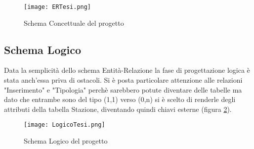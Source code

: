 \begin{figure}[ht!]
    \centering
    {\texttt{[image: ERTesi.png]}}
    \caption{Schema Concettuale del progetto}
    \label{schemaEr}
\end{figure} 

\subsection{Schema Logico}
Data la semplicità dello schema Entità-Relazione la fase di progettazione logica
è stata anch'essa priva di ostacoli. Si è posta particolare attenzione alle
relazioni "Inserimento" e "Tipologia" perchè sarebbero potute diventare delle
tabelle ma dato che entrambe sono del tipo (1,1) verso (0,n) si è scelto di
renderle degli attributi della tabella Stazione, diventando quindi chiavi
esterne (figura \ref{schemaLogico}). 

\begin{figure}[ht!]
    \centering
    {\texttt{[image: LogicoTesi.png]}}
    \caption{Schema Logico del progetto}
    \label{schemaLogico}
\end{figure} 

